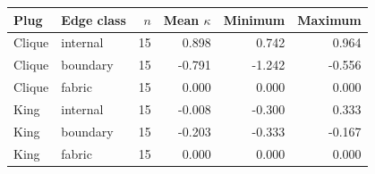 \begin{tabular}{llrrrr}
\toprule
Plug & Edge class & $n$ & Mean $\kappa$ & Minimum & Maximum \\
\midrule
Clique & internal & 15 & 0.898 & 0.742 & 0.964 \\
Clique & boundary & 15 & -0.791 & -1.242 & -0.556 \\
Clique & fabric & 15 & 0.000 & 0.000 & 0.000 \\
King & internal & 15 & -0.008 & -0.300 & 0.333 \\
King & boundary & 15 & -0.203 & -0.333 & -0.167 \\
King & fabric & 15 & 0.000 & 0.000 & 0.000 \\
\bottomrule
\end{tabular}
